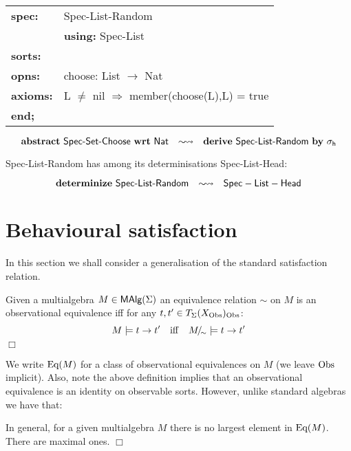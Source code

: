 \medskip 
\begin{tabular}{ll}
{\bf spec:}   & {\sf Spec-List-Random} \\
              & {\bf using:} {\sf Spec-List} \\
{\bf sorts:}  & \\
{\bf opns:}   & {\sf choose: List $\rightarrow$ Nat} \\
{\bf axioms:} & {\sf L $\not=$ nil $\Rightarrow$ 
                member(choose(L),L) = true }\\
{\bf end;}
\end{tabular}

\[
{\rm \bf abstract}\ \mbox{\sf Spec-Set-Choose}\ {\rm \bf wrt}\ \sf Nat \quad \mbox{$\sim\!\leadsto$} \quad
{\rm \bf derive}\ \mbox{\sf Spec-List-Random}\ {\rm \bf by}\ \sigma_h
\]

{\sf Spec-List-Random} has among its determinisations {\sf
Spec-List-Head}:

\[
{\rm \bf determinize}\ \mbox{\sf Spec-List-Random} \quad \mbox{$\sim\!\leadsto$} \quad {\sf Spec-List-Head}
\]


%

\section{Behavioural satisfaction}

In this section we shall consider a generalisation of the standard
satisfaction relation.

\begin{Definition}
Given a multialgebra $M \in \mbox{\rm\sf MAlg}(\Sigma)$ an equivalence relation
$\sim$ on $M$ is an observational equivalence iff for any $t,t' \in
T_\Sigma(X_{\rm Obs})_{\rm Obs}$:
\[
M \models t \rightarrow t' \quad {\rm iff} \quad 
M\!{\textstyle /}\!_{\sim} \models t \rightarrow t'
\]
\hfill$\Box$
\end{Definition}
%
We write $\mbox{Eq}(M)$ for a class of observational equivalences on $M$ (we
leave $\rm Obs$ implicit). Also, note the above definition implies that
an observational equivalence is an identity on observable sorts. 
However, unlike standard algebras we have that:

\begin{Fact}
In general, for a given multialgebra $M$ there is no largest element
in $\mbox{Eq}(M)$. There are maximal ones. 
\hfill$\Box$
\end{Fact}


